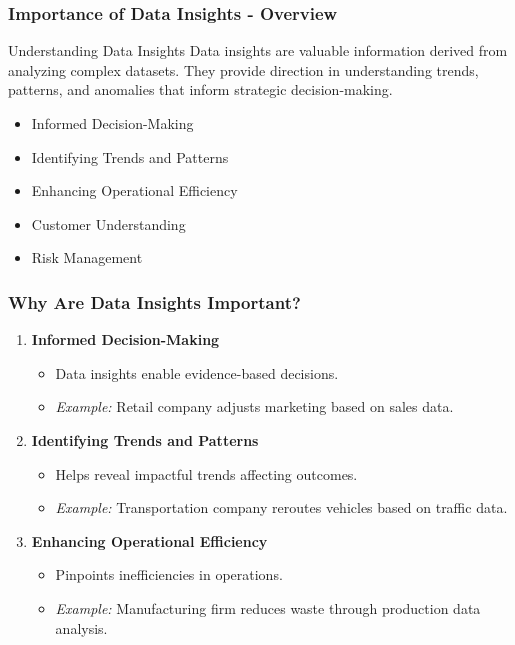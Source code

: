\documentclass[aspectratio=169]{beamer}
\begin{document}
\begin{frame}[fragile]
    \frametitle{Importance of Data Insights - Overview}
    \begin{block}{Understanding Data Insights}
        Data insights are valuable information derived from analyzing complex datasets. They provide direction in understanding trends, patterns, and anomalies that inform strategic decision-making.
    \end{block}
    \begin{itemize}
        \item Informed Decision-Making
        \item Identifying Trends and Patterns
        \item Enhancing Operational Efficiency
        \item Customer Understanding
        \item Risk Management
    \end{itemize}
\end{frame}

\begin{frame}[fragile]
    \frametitle{Why Are Data Insights Important?}
    \begin{enumerate}
        \item \textbf{Informed Decision-Making}
            \begin{itemize}
                \item Data insights enable evidence-based decisions.
                \item \textit{Example:} Retail company adjusts marketing based on sales data.
            \end{itemize}
        \item \textbf{Identifying Trends and Patterns}
            \begin{itemize}
                \item Helps reveal impactful trends affecting outcomes.
                \item \textit{Example:} Transportation company reroutes vehicles based on traffic data.
            \end{itemize}
        \item \textbf{Enhancing Operational Efficiency}
            \begin{itemize}
                \item Pinpoints inefficiencies in operations.
                \item \textit{Example:} Manufacturing firm reduces waste through production data analysis.
            \end{itemize}
    \end{enumerate}
\end{frame}
\end{document}

